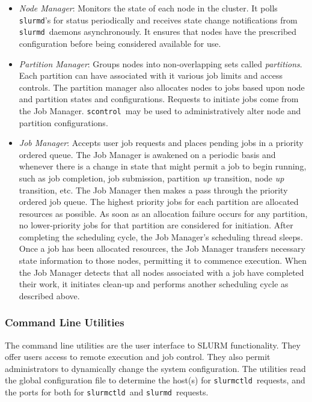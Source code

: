 \documentclass{article}
\newcommand{\scontrol}{{\tt scontrol}}
\newcommand{\slurmctld}{{\tt slurmctld}}
\newcommand{\slurmd}{{\tt slurmd}}
\begin{document}
\begin{itemize}
\item {\em Node Manager}: Monitors the state of each node in
the cluster.  It polls {\tt slurmd}'s for status periodically and
receives state change notifications from \slurmd\ daemons asynchronously.
It ensures that nodes have the prescribed configuration before being 
considered available for use.

\item {\em Partition Manager}: Groups nodes into non-overlapping sets called
{\em partitions}. Each partition can have associated with it various job
limits and access controls.  The partition manager also allocates nodes
to jobs based upon node and partition states and configurations. Requests
to initiate jobs come from the Job Manager.  \scontrol\ may be used
to administratively alter node and partition configurations.

\item {\em Job Manager}: Accepts user job requests and places pending 
jobs in a priority ordered queue. 
The Job Manager is awakened on a periodic basis and whenever there
is a change in state that might permit a job to begin running, such
as job completion, job submission, partition {\em up} transition,
node {\em up} transition, etc.  The Job Manager then makes a pass
through the priority ordered job queue. The highest priority jobs 
for each partition are allocated resources as possible. As soon as an 
allocation failure occurs for any partition, no lower-priority jobs for 
that partition are considered for initiation. 
After completing the scheduling cycle, the Job Manager's scheduling
thread sleeps.  Once a job has been allocated resources, the Job Manager
transfers necessary state information to those nodes, permitting it 
to commence execution.  When the Job Manager detects that
all nodes associated with a job have completed their work, it initiates
clean-up and performs another scheduling cycle as described above.

\end{itemize}

\subsubsection{Command Line Utilities}

The command line utilities are the user interface to SLURM functionality.
They offer users access to remote execution and job control. They also 
permit administrators to dynamically change the system configuration. The 
utilities read the global configuration file
to determine the host(s) for \slurmctld\ requests, and the ports for 
both for \slurmctld\ and \slurmd\ requests. 
\end{document}
